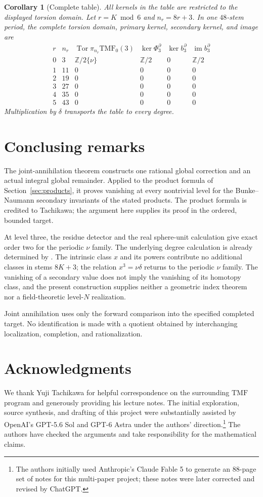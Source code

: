 \documentclass[11pt,a4paper]{amsart}
\newcommand{\Z}{\mathbb Z}
\newcommand{\TMF}{\mathrm{TMF}}
\newcommand{\im}{\operatorname{im}}
\newcommand{\Tor}{\operatorname{Tor}}
\theoremstyle{plain}
\newtheorem{corollary}[theorem]{Corollary}
\theoremstyle{definition}
\theoremstyle{remark}
\begin{document}
\begin{corollary}[Complete table]\label{cor:table}
All kernels in the table are restricted to the displayed torsion domain.
Let $r=K\bmod6$ and $n_r=8r+3$. In one $48$-stem period, the complete
torsion domain, primary kernel, secondary kernel, and image are
\[
\begin{array}{c|c|c|c|c|c}
 r&n_r&\Tor\pi_{n_r}\TMF_0(3)&\ker\Phi_3^\partial&\ker b_3^\partial&\im b_3^\partial\\
\hline
0&3&\Z/2\{\nu\}&\Z/2&0&\Z/2\\
1&11&0&0&0&0\\
2&19&0&0&0&0\\
3&27&0&0&0&0\\
4&35&0&0&0&0\\
5&43&0&0&0&0
\end{array}
\]
Multiplication by $\delta$ transports the table to every degree.
\end{corollary}

\section{Conclusing remarks}

The joint-annihilation theorem constructs one rational global
correction and an actual integral global remainder. Applied to the
product formula of Section~\ref{sec:products}, it proves vanishing
at every nontrivial level for the Bunke--Naumann secondary invariants
of the stated products. The product formula is credited to Tachikawa;
the argument here supplies its proof in the ordered, bounded target.

At level three, the residue detector and the real sphere-unit
calculation give exact order two for the periodic $\nu$ family.
The underlying degree calculation is already determined by
\cite[Proposition~4.1]{MR}. The intrinsic class $x$ and its powers
contribute no additional classes in stems $8K+3$; the relation
$x^3=\nu\delta$ returns to the periodic $\nu$ family. The
vanishing of a secondary value does not imply the vanishing of its
homotopy class, and the present construction supplies neither a
geometric index theorem nor a field-theoretic level-$N$ realization.

Joint annihilation uses only the forward comparison into the
specified completed target. No identification is made with a
quotient obtained by interchanging localization, completion,
and rationalization.

\section*{Acknowledgments}
We thank Yuji Tachikawa for helpful correspondence on the surrounding $\TMF$ program and generously providing his lecture notes. The initial exploration, source synthesis, and drafting of this project were substantially assisted by OpenAI's GPT-5.6 Sol and GPT-6 Astra under the authors' direction.\footnote{The authors initially used Anthropic's Claude Fable 5 to generate an 88-page set of notes for this multi-paper project; these notes were later corrected and revised by ChatGPT.} The authors have checked the arguments and take responsibility for the mathematical claims.
\end{document}
